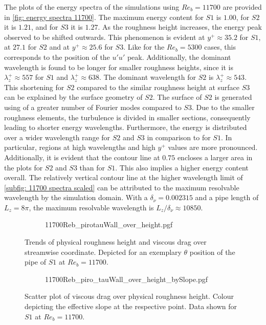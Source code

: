 The plots of the energy spectra of the simulations using $Re_b = 11700$ are provided in \autoref{fig: energy spectra 11700}.
The maximum energy content for $S1$ is $1.00$, for $S2$ it is $1.21$, and for $S3$ it is $1.27$.
As the roughness height increases, the energy peak observed to be shifted outwards. This phenomenon is evident  at $y^+ \approx 35.2$ for $S1$, at $27.1$ for $S2$ and at $y^+ \approx 25.6$ for $S3$.
Like for the $Re_b = 5300$ cases, this corresponds to  the position of the $u'u'$ peak.
Additionally, the dominant wavelength is found to be longer for smaller roughness heights, since it is $\lambda_z^+ \approx 557$ for $S1$ and $\lambda_z^+ \approx 638$.
The dominant wavelength  for $S2$ is $\lambda_z^+ \approx 543$.
This shortening for $S2$ compared to the similar roughness height at surface $S3$ can be explained by the surface geometry of $S2$. The surface of $S2$  is generated using of a greater number of Fourier modes compared to $S3$.
Due to the smaller roughness elements, the turbulence is divided in smaller  sections,  consequently leading to shorter energy wavelengths.
Furthermore, the energy is distributed over a wider wavelength range  for $S2$ and $S3$ in comparison to for $S1$.
In particular, regions at high wavelengths and high $y^+$ values are more pronounced.
Additionally, it is evident that the contour line at $0.75$ encloses a larger area in the plots for $S2$ and $S3$ than for $S1$. This also implies a higher energy content overall.
The relatively vertical contour line at the higher wavelength limit of \autoref{subfig: 11700 spectra scaled} can be attributed to the maximum resolvable wavelength by the simulation domain.
With a $\delta_\nu = 0.002315$ and a pipe length of $L_z = 8\pi$, the maximum resolvable wavelength is $L_z / \delta_\nu \approx 10850$.
\begin{figure}
    \centering
    \begin{subfigure}{0.75\textwidth}
        \centering
        {11700Reb_pirotauWall_over_height.pgf}
    \end{subfigure}
    \caption[Trends of physical roughness height and viscous drag over streamwise coordinate for $Re_b = 11700$]{Trends of physical roughness height and viscous drag over streamwise coordinate. Depicted for an exemplary $\theta$ position of the pipe of $S1$ at $Re_b = 11700$.}
    \label{fig: roughness height and viscous stress Reb 11700 piro}
\end{figure}
\begin{figure}
    \centering
    \begin{subfigure}{0.7\textwidth}
        \hspace{0.9cm}
        {11700Reb_piro_tauWall_over_height_bySlope.pgf}
    \end{subfigure}
    \caption[Scatter plot of viscous drag over physical roughness height at $Re_b = 11700$]{Scatter plot of viscous drag over physical roughness height. Colour depicting the effective slope at the respective point. Data shown for $S1$ at $Re_b = 11700$.}
    \label{fig: scatterplot piro Reb 11700}
\end{figure}


